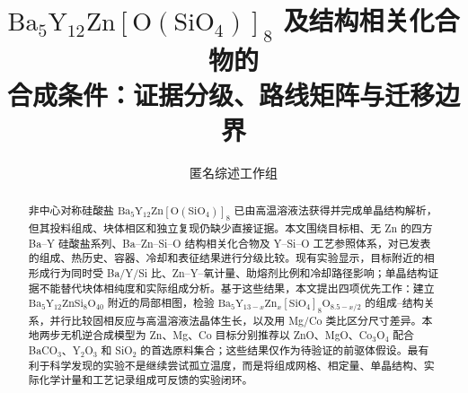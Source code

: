 \documentclass[10pt,linespread=1.5]{ctexart}
\title{$\mathrm{Ba_5Y_{12}Zn[O(SiO_4)]_8}$ 及结构相关化合物的\\
合成条件：证据分级、路线矩阵与迁移边界}
\author{匿名综述工作组}
\date{}
\begin{document}
\maketitle

\begin{abstract}
非中心对称硅酸盐 $\mathrm{Ba_5Y_{12}Zn[O(SiO_4)]_8}$ 已由高温溶液法获得并完成单晶结构解析，但其投料组成、块体相区和独立复现仍缺少直接证据。本文围绕目标相、无 Zn 的四方 Ba--Y 硅酸盐系列、Ba--Zn--Si--O 结构相关化合物及 Y--Si--O 工艺参照体系，对已发表的组成、热历史、容器、冷却和表征结果进行分级比较。现有实验显示，目标附近的相形成行为同时受 Ba/Y/Si 比、Zn--Y--氧计量、助熔剂比例和冷却路径影响；单晶结构证据不能替代块体相纯度和实际组成分析。基于这些结果，本文提出四项优先工作：建立 $\mathrm{Ba_5Y_{12}ZnSi_8O_{40}}$ 附近的局部相图，检验 $\mathrm{Ba_5Y_{13-\mathit{x}}Zn_{\mathit{x}}[SiO_4]_8O_{8.5-\mathit{x}/2}}$ 的组成--结构关系，并行比较固相反应与高温溶液法晶体生长，以及用 Mg/Co 类比区分尺寸差异。本地两步无机逆合成模型为 Zn、Mg、Co 目标分别推荐以 ZnO、MgO、Co$_3$O$_4$ 配合 BaCO$_3$、Y$_2$O$_3$ 和 SiO$_2$ 的首选原料集合；这些结果仅作为待验证的前驱体假设。最有利于科学发现的实验不是继续尝试孤立温度，而是将组成网格、相定量、单晶结构、实际化学计量和工艺记录组成可反馈的实验闭环。
\end{abstract}















\end{document}
